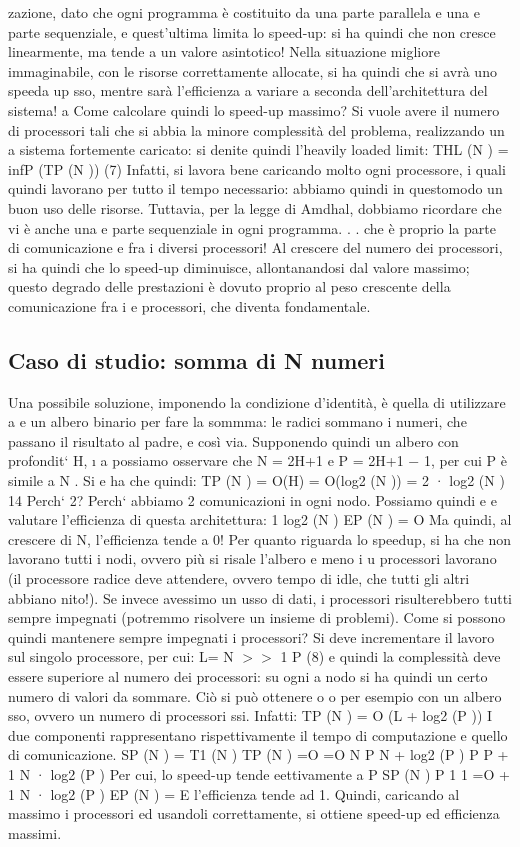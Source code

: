 \documentclass[a4paper,12pt]{article}
\begin{document}
zazione, dato che ogni programma è costituito da una parte parallela e una
e
parte sequenziale, e quest'ultima limita lo speed-up: si ha quindi che non cresce
linearmente, ma tende a un valore asintotico! Nella situazione migliore immaginabile, con le risorse correttamente
allocate, si ha quindi che si avrà uno speeda
up sso, mentre sarà l'efficienza a variare a seconda dell'architettura del sistema!
a
Come calcolare quindi lo speed-up massimo? Si vuole avere il numero di
processori tali che si abbia la minore complessità del problema, realizzando un
a
sistema fortemente caricato: si denite quindi l'heavily loaded limit:
THL (N ) = infP (TP (N ))
(7)
Infatti, si lavora bene caricando molto ogni processore, i quali quindi lavorano
per tutto il tempo necessario: abbiamo quindi in questomodo un buon uso delle
risorse.
Tuttavia, per la legge di Amdhal, dobbiamo ricordare che vi è anche una
e
parte sequenziale in ogni programma. . . che è proprio la parte di comunicazione
e
fra i diversi processori! Al crescere del numero dei processori, si ha quindi
che lo speed-up diminuisce, allontanandosi dal valore massimo; questo degrado
delle prestazioni è dovuto proprio al peso crescente della comunicazione fra i
e
processori, che diventa fondamentale.
\subsection{Caso di studio: somma di N numeri}
Una possibile soluzione, imponendo la condizione d'identità, è quella di utilizzare
a e
un albero binario per fare la sommma: le radici sommano i numeri, che passano
il risultato al padre, e così via. Supponendo quindi un albero con profondit` H,
\i{}
a
possiamo osservare che N = 2H+1 e P = 2H+1 $-$ 1, per cui P è simile a N . Si
e
ha che quindi:
TP (N ) = O(H)
= O(log2 (N ))
= 2 · log2 (N )
14
Perch` 2? Perch` abbiamo 2 comunicazioni in ogni nodo. Possiamo quindi
e
e
valutare l'efficienza di questa architettura:
1
log2 (N )
EP (N ) = O
Ma quindi, al crescere di N, l'efficienza tende a 0! Per quanto riguarda lo speedup, si ha che non lavorano tutti i
nodi,
ovvero più si risale l'albero e meno i
u
processori lavorano (il processore radice deve attendere, ovvero tempo di idle,
che tutti gli altri abbiano nito!). Se invece avessimo un usso di dati, i processori risulterebbero tutti sempre
impegnati (potremmo risolvere un insieme di
problemi).
Come si possono quindi mantenere sempre impegnati i processori? Si deve
incrementare il lavoro sul singolo processore, per cui:
L=
N
$>$$>$ 1
P
(8)
e quindi la complessità deve essere superiore al numero dei processori: su ogni
a
nodo si ha quindi un certo numero di valori da sommare. Ciò si può ottenere
o
o
per esempio con un albero sso, ovvero un numero di processori ssi. Infatti:
TP (N ) = O (L + log2 (P ))
I due componenti rappresentano rispettivamente il tempo di computazione e
quello di comunicazione.
SP (N ) =
T1 (N )
TP (N )
=O
=O
N
P
N
+ log2 (P )
P
P
+
1
N · log2 (P )
Per cui, lo speed-up tende eettivamente a P
SP (N )
P
1
1
=O
+
1 N · log2 (P )
EP (N ) =
E l'efficienza tende ad 1. Quindi, caricando al massimo i processori ed usandoli
correttamente, si ottiene speed-up ed efficienza massimi.
\end{document}
